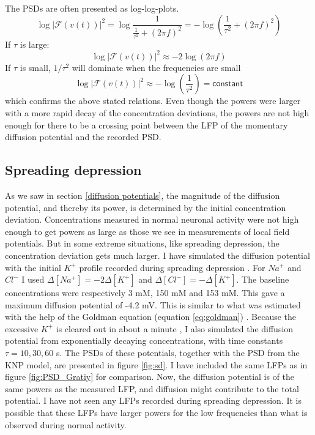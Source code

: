 \documentclass{article}
\begin{document}
The PSDs are often presented as log-log-plots.
$$
\log |\mathcal{F}(v(t))|^2= \log \frac{1}{\frac{1}{\tau^2} +(2\pi f)^2}=- \log(\frac{1}{\tau^2} +(2\pi f)^2)
$$
If $\tau$ is large:
$$
\log |\mathcal{F}(v(t))|^2 \approx -2\log(2\pi f)
$$
If $\tau$ is small, $1/\tau^2$ will dominate when the frequencies are small
$$
\log |\mathcal{F}(v(t))|^2 \approx -\log(\frac{1}{\tau^2})=\mathsf{constant}
$$
which confirms the above stated relations. 
Even though the powers were larger with a more rapid decay of the concentration deviations, the powers are not high enough for there to be a crossing point between the LFP of the momentary diffusion potential and the recorded PSD. 

\subsection{Spreading depression}\label{SD simulated}

As we saw in section \ref{diffusion potentials}, the magnitude of the diffusion potential, and thereby its power, is determined by the initial concentration deviation. Concentrations measured in normal neuronal activity were not high enough to get powers as large as those we see in measurements of local field potentials. But in some extreme situations, like spreading depression, the concentration deviation gets much larger. I have simulated the diffusion potential with the initial $K^+$ profile recorded during spreading depression \cite{Herreras1993}. For $Na^+$ and $Cl^-$ I used $\Delta [Na^+] = -2\Delta [K^+]$ and $\Delta [Cl^-] = -\Delta[K^+]$. The baseline concentrations were respectively 3 mM, 150 mM and 153 mM. This gave a maximum diffusion potential of -4.2 mV. This is similar to what was estimated with the help of the Goldman equation (equation \ref{eq:goldman}) \cite{Herreras1993}. Because the excessive $K^+$ is cleared out in about a minute \cite{Ataya2015}, I also simulated the diffusion potential from exponentially decaying concentrations, with time constants $\tau = 10, 30, 60 $ s. The PSDs of these potentials, together with the PSD from the KNP model, are presented in figure \ref{fig:sd}. I have included the same LFPs as in figure \ref{fig:PSD_Gratiy} for comparison. 
Now, the diffusion potential is of the same powers as the measured  LFP, and diffusion might contribute to the total potential. I have not seen any LFPs recorded during spreading depression. It is possible that these LFPs have larger powers for the low frequencies than what is observed during normal activity. 
\end{document}
